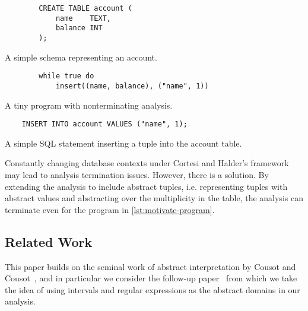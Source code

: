 \begin{listing}
    \begin{verbatim}
        CREATE TABLE account (
            name    TEXT,
            balance INT
        );
    \end{verbatim}
    \caption{A simple schema representing an account.}
    \label{lst:motivate-sql}
\end{listing}


\begin{listing}
    \begin{verbatim}
        while true do
            insert((name, balance), ("name", 1))
    \end{verbatim}
    \caption{A tiny program with nonterminating analysis.}
    \label{lst:motivate-program}
\end{listing}

\begin{listing}
    \begin{verbatim}
    INSERT INTO account VALUES ("name", 1);
    \end{verbatim}
    \caption{A simple SQL statement inserting a tuple into the account table.}
    \label{lst:motivate-sql-insert}
\end{listing}


Constantly changing database contexts under Cortesi and Halder's framework may lead to analysis termination issues. 
However, there is a solution.
By extending the analysis to include abstract tuples, i.e. representing tuples with abstract values and abstracting over the multiplicity in the table, the analysis can terminate even for the program in \autoref{lst:motivate-program}.



\subsection{Related Work}\label{subsec:related-work}
This paper builds on the seminal work of abstract interpretation by Cousot and Cousot~\cite{cousot_abstract_1977}, and in particular we consider the follow-up paper~\cite{cousot_abstract_1996} from which we take the idea of using intervals and regular expressions as the abstract domains in our analysis.

